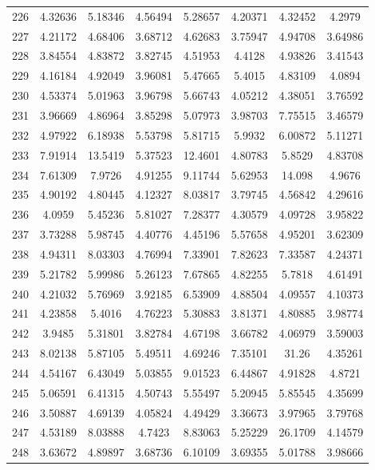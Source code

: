 \begin{center}
\begin{longtable}{cccccccc}
226 & 4.32636 & 5.18346 & 4.56494 & 5.28657 & 4.20371 & 4.32452 & 4.2979\\
227 & 4.21172 & 4.68406 & 3.68712 & 4.62683 & 3.75947 & 4.94708 & 3.64986\\
228 & 3.84554 & 4.83872 & 3.82745 & 4.51953 & 4.4128 & 4.93826 & 3.41543\\
229 & 4.16184 & 4.92049 & 3.96081 & 5.47665 & 5.4015 & 4.83109 & 4.0894\\
230 & 4.53374 & 5.01963 & 3.96798 & 5.66743 & 4.05212 & 4.38051 & 3.76592\\
231 & 3.96669 & 4.86964 & 3.85298 & 5.07973 & 3.98703 & 7.75515 & 3.46579\\
232 & 4.97922 & 6.18938 & 5.53798 & 5.81715 & 5.9932 & 6.00872 & 5.11271\\
233 & 7.91914 & 13.5419 & 5.37523 & 12.4601 & 4.80783 & 5.8529 & 4.83708\\
234 & 7.61309 & 7.9726 & 4.91255 & 9.11744 & 5.62953 & 14.098 & 4.9676\\
235 & 4.90192 & 4.80445 & 4.12327 & 8.03817 & 3.79745 & 4.56842 & 4.29616\\
236 & 4.0959 & 5.45236 & 5.81027 & 7.28377 & 4.30579 & 4.09728 & 3.95822\\
237 & 3.73288 & 5.98745 & 4.40776 & 4.45196 & 5.57658 & 4.95201 & 3.62309\\
238 & 4.94311 & 8.03303 & 4.76994 & 7.33901 & 7.82623 & 7.33587 & 4.24371\\
239 & 5.21782 & 5.99986 & 5.26123 & 7.67865 & 4.82255 & 5.7818 & 4.61491\\
240 & 4.21032 & 5.76969 & 3.92185 & 6.53909 & 4.88504 & 4.09557 & 4.10373\\
241 & 4.23858 & 5.4016 & 4.76223 & 5.30883 & 3.81371 & 4.80885 & 3.98774\\
242 & 3.9485 & 5.31801 & 3.82784 & 4.67198 & 3.66782 & 4.06979 & 3.59003\\
243 & 8.02138 & 5.87105 & 5.49511 & 4.69246 & 7.35101 & 31.26 & 4.35261\\
244 & 4.54167 & 6.43049 & 5.03855 & 9.01523 & 6.44867 & 4.91828 & 4.8721\\
245 & 5.06591 & 6.41315 & 4.50743 & 5.55497 & 5.20945 & 5.85545 & 4.35699\\
246 & 3.50887 & 4.69139 & 4.05824 & 4.49429 & 3.36673 & 3.97965 & 3.79768\\
247 & 4.53189 & 8.03888 & 4.7423 & 8.83063 & 5.25229 & 26.1709 & 4.14579\\
248 & 3.63672 & 4.89897 & 3.68736 & 6.10109 & 3.69355 & 5.01788 & 3.98666\\

\end{longtable}
\end{center}
